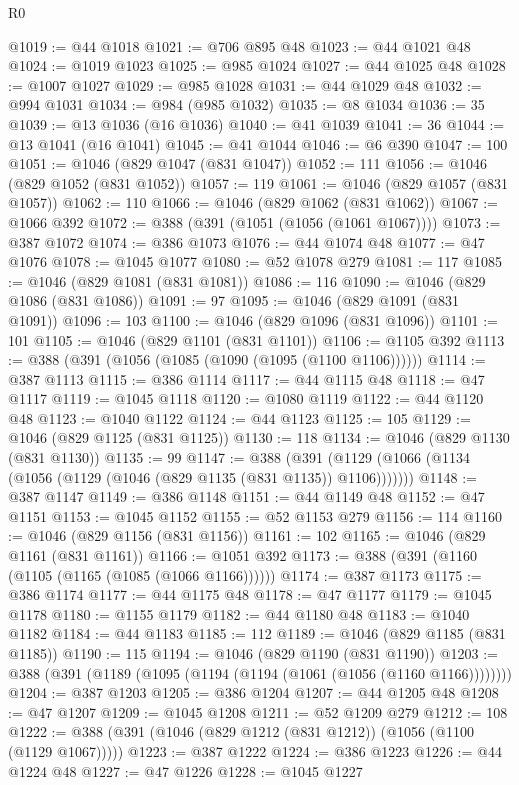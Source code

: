 \begin{lexlean}{R0}
\begin{coremodule}
{{{{{{{{{{{{{{{{{{{{{{{{{{{{{{{{{{{{{{{{{{{{{{{{{{{{{{{{{{{{{{{{{{{{{{{{{@1019 := @44 @1018
@1021 := @706 @895 @48
@1023 := @44 @1021 @48
@1024 := @1019 @1023
@1025 := @985 @1024
@1027 := @44 @1025 @48
@1028 := @1007 @1027
@1029 := @985 @1028
@1031 := @44 @1029 @48
@1032 := @994 @1031
@1034 := @984 (@985 @1032)
@1035 := @8 @1034
@1036 := 35
@1039 := @13 @1036 (@16 @1036)
@1040 := @41 @1039
@1041 := 36
@1044 := @13 @1041 (@16 @1041)
@1045 := @41 @1044
@1046 := @6 @390
@1047 := 100
@1051 := @1046 (@829 @1047 (@831 @1047))
@1052 := 111
@1056 := @1046 (@829 @1052 (@831 @1052))
@1057 := 119
@1061 := @1046 (@829 @1057 (@831 @1057))
@1062 := 110
@1066 := @1046 (@829 @1062 (@831 @1062))
@1067 := @1066 @392
@1072 := @388 (@391 (@1051 (@1056 (@1061 @1067))))
@1073 := @387 @1072
@1074 := @386 @1073
@1076 := @44 @1074 @48
@1077 := @47 @1076
@1078 := @1045 @1077
@1080 := @52 @1078 @279
@1081 := 117
@1085 := @1046 (@829 @1081 (@831 @1081))
@1086 := 116
@1090 := @1046 (@829 @1086 (@831 @1086))
@1091 := 97
@1095 := @1046 (@829 @1091 (@831 @1091))
@1096 := 103
@1100 := @1046 (@829 @1096 (@831 @1096))
@1101 := 101
@1105 := @1046 (@829 @1101 (@831 @1101))
@1106 := @1105 @392
@1113 := @388 (@391 (@1056 (@1085 (@1090 (@1095 (@1100 @1106))))))
@1114 := @387 @1113
@1115 := @386 @1114
@1117 := @44 @1115 @48
@1118 := @47 @1117
@1119 := @1045 @1118
@1120 := @1080 @1119
@1122 := @44 @1120 @48
@1123 := @1040 @1122
@1124 := @44 @1123
@1125 := 105
@1129 := @1046 (@829 @1125 (@831 @1125))
@1130 := 118
@1134 := @1046 (@829 @1130 (@831 @1130))
@1135 := 99
@1147 := @388 (@391 (@1129 (@1066 (@1134 (@1056 (@1129 (@1046 (@829 @1135 (@831 @1135)) @1106)))))))
@1148 := @387 @1147
@1149 := @386 @1148
@1151 := @44 @1149 @48
@1152 := @47 @1151
@1153 := @1045 @1152
@1155 := @52 @1153 @279
@1156 := 114
@1160 := @1046 (@829 @1156 (@831 @1156))
@1161 := 102
@1165 := @1046 (@829 @1161 (@831 @1161))
@1166 := @1051 @392
@1173 := @388 (@391 (@1160 (@1105 (@1165 (@1085 (@1066 @1166))))))
@1174 := @387 @1173
@1175 := @386 @1174
@1177 := @44 @1175 @48
@1178 := @47 @1177
@1179 := @1045 @1178
@1180 := @1155 @1179
@1182 := @44 @1180 @48
@1183 := @1040 @1182
@1184 := @44 @1183
@1185 := 112
@1189 := @1046 (@829 @1185 (@831 @1185))
@1190 := 115
@1194 := @1046 (@829 @1190 (@831 @1190))
@1203 := @388 (@391 (@1189 (@1095 (@1194 (@1194 (@1061 (@1056 (@1160 @1166))))))))
@1204 := @387 @1203
@1205 := @386 @1204
@1207 := @44 @1205 @48
@1208 := @47 @1207
@1209 := @1045 @1208
@1211 := @52 @1209 @279
@1212 := 108
@1222 := @388 (@391 (@1046 (@829 @1212 (@831 @1212)) (@1056 (@1100 (@1129 @1067)))))
@1223 := @387 @1222
@1224 := @386 @1223
@1226 := @44 @1224 @48
@1227 := @47 @1226
@1228 := @1045 @1227
}}}}}}}}}}}}}}}}}}}}}}}}}}}}}}}}}}}}}}}}}}}}}}}}}}}}}}}}}}}}}}}}}}}}}}}}}
\end{coremodule}
\end{lexlean}
